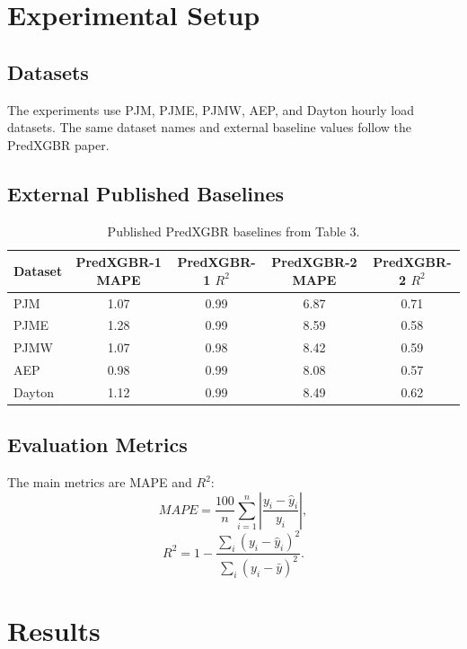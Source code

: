 \documentclass[11pt]{article}
\begin{document}
\section{Experimental Setup}
\subsection{Datasets}
The experiments use PJM, PJME, PJMW, AEP, and Dayton hourly load datasets. The same dataset names and external baseline values follow the PredXGBR paper.

\subsection{External Published Baselines}
\begin{table}[H]
\centering
\caption{Published PredXGBR baselines from Table 3.}
\begin{tabular}{lcccc}
\toprule
Dataset & PredXGBR-1 MAPE & PredXGBR-1 $R^2$ & PredXGBR-2 MAPE & PredXGBR-2 $R^2$ \\
\midrule
PJM & 1.07 & 0.99 & 6.87 & 0.71 \\
PJME & 1.28 & 0.99 & 8.59 & 0.58 \\
PJMW & 1.07 & 0.98 & 8.42 & 0.59 \\
AEP & 0.98 & 0.99 & 8.08 & 0.57 \\
Dayton & 1.12 & 0.99 & 8.49 & 0.62 \\
\bottomrule
\end{tabular}
\end{table}

\subsection{Evaluation Metrics}
The main metrics are MAPE and $R^2$:
\begin{equation}
MAPE = \frac{100}{n}\sum_{i=1}^{n}\left|\frac{y_i-\hat{y}_i}{y_i}\right|,
\end{equation}
\begin{equation}
R^2 = 1 - \frac{\sum_i(y_i-\hat{y}_i)^2}{\sum_i(y_i-\bar{y})^2}.
\end{equation}

\section{Results}
\end{document}
